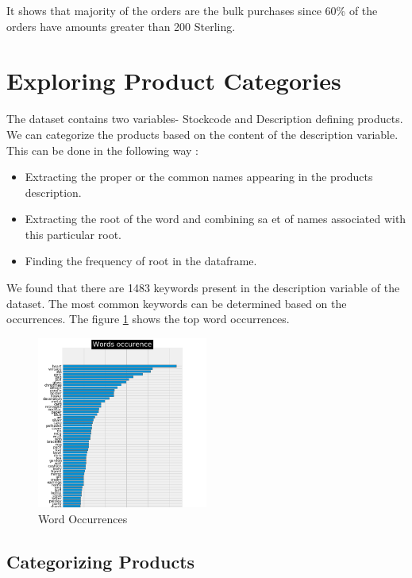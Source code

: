 It shows that majority of the orders are the bulk purchases since 60\% of the orders have amounts greater than 200 Sterling.

\section*{Exploring Product Categories}

The dataset contains two variables- Stockcode and Description defining products. We can categorize the products based on the content of the description variable. This can be done in the following way :\\

\begin{itemize}
  \item Extracting the proper or the common names appearing in the products description.
  \item Extracting the root of the word and combining sa et of names associated with this particular root.
  \item Finding the frequency of root in the dataframe.
 \end{itemize}
 
 We found that there are 1483 keywords present in the description variable of the dataset. The most common keywords can be determined based on the occurrences. The figure \ref{3.1} shows the top word occurrences.
 
 \begin{figure}[H]
\caption{Word Occurrences}
\label{3.1}
\centering
\includegraphics[width=0.5\textwidth]{images/3_1.PNG}
\end{figure}

\subsection{Categorizing Products}

